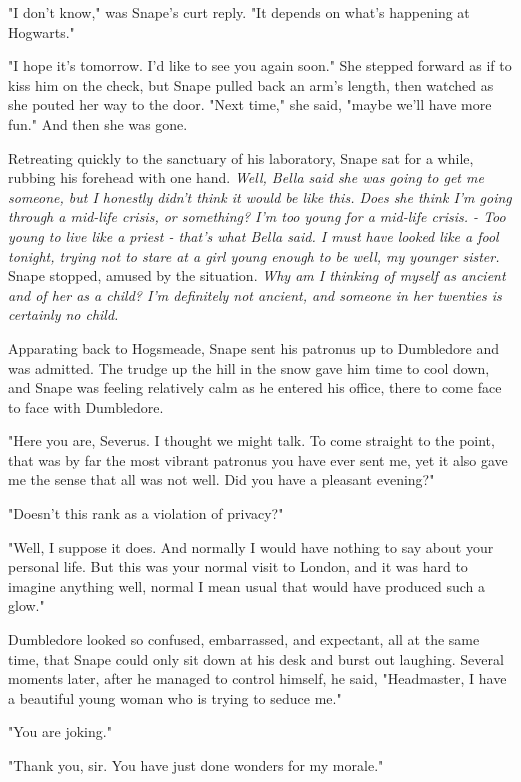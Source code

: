 "I don't know," was Snape's curt reply. "It depends on what's happening at Hogwarts."

"I hope it's tomorrow. I'd like to see you again soon." She stepped forward as if to kiss him on the check, but Snape pulled back an arm's length, then watched as she pouted her way to the door. "Next time," she said, "maybe we'll have more fun." And then she was gone.

Retreating quickly to the sanctuary of his laboratory, Snape sat for a while, rubbing his forehead with one hand. \emph{Well, Bella said she was going to get me someone, but I honestly didn't think it would be like this. Does she think I'm going through a mid-life crisis, or something? I'm too young for a mid-life crisis. - Too young to live like a priest - that's what Bella said. I must have looked like a fool tonight, trying not to stare at a girl young enough to be{\el} well, my younger sister.} Snape stopped, amused by the situation. \emph{Why am I thinking of myself as ancient and of her as a child? I'm definitely not ancient, and someone in her twenties is certainly no child.}

Apparating back to Hogsmeade, Snape sent his patronus up to Dumbledore and was admitted. The trudge up the hill in the snow gave him time to cool down, and Snape was feeling relatively calm as he entered his office, there to come face to face with Dumbledore.

"Here you are, Severus. I thought we might talk. To come straight to the point, that was by far the most vibrant patronus you have ever sent me, yet it also gave me the sense that all was not well. Did you have a{\el} pleasant evening?"

"Doesn't this rank as a violation of privacy?"

"Well, I suppose it does. And normally I would have nothing to say about your personal life. But this was your normal visit to{\el} London, and it was hard to imagine anything{\el} well, normal{\el} I mean usual{\el} that would have produced such a{\el} glow."

Dumbledore looked so confused, embarrassed, and expectant, all at the same time, that Snape could only sit down at his desk and burst out laughing. Several moments later, after he managed to control himself, he said, "Headmaster, I have a beautiful young woman who is trying to seduce me."

"You are joking."

"Thank you, sir. You have just done wonders for my morale."


